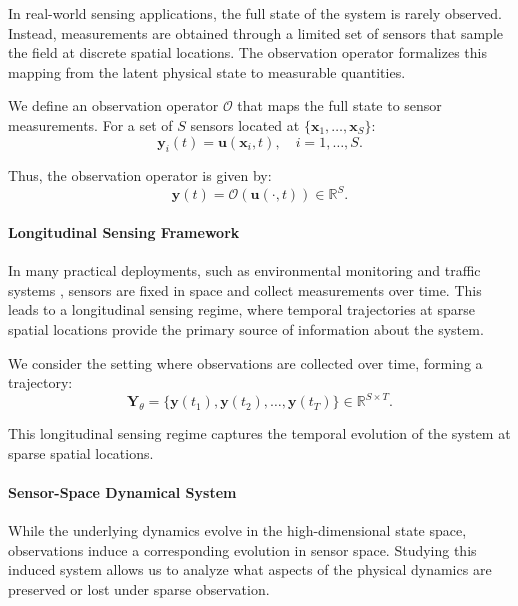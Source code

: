 In real-world sensing applications, the full state of the system is rarely observed. Instead, measurements are obtained through a limited set of sensors that sample the field at discrete spatial locations. The observation operator formalizes this mapping from the latent physical state to measurable quantities.

We define an observation operator $\mathcal{O}$ that maps the full state to sensor measurements. For a set of $S$ sensors located at $\{\mathbf{x}_1, \dots, \mathbf{x}_S\}$:
\begin{equation}
\mathbf{y}_i(t) = \mathbf{u}(\mathbf{x}_i, t), \quad i = 1, \dots, S.
\end{equation}

Thus, the observation operator is given by:
\begin{equation}
\mathbf{y}(t) = \mathcal{O}(\mathbf{u}(\cdot,t)) \in \mathbb{R}^S.
\end{equation}

\paragraph{Longitudinal Sensing Framework}

In many practical deployments, such as environmental monitoring \citep{bhardwaj2025comprehensive, iyer2022modeling} and traffic systems \citep{bhardwaj2023understanding}, sensors are fixed in space and collect measurements over time. This leads to a longitudinal sensing regime, where temporal trajectories at sparse spatial locations provide the primary source of information about the system.

We consider the setting where observations are collected over time, forming a trajectory:
\begin{equation}
\mathbf{Y}_\theta = \{\mathbf{y}(t_1), \mathbf{y}(t_2), \dots, \mathbf{y}(t_T)\} \in \mathbb{R}^{S \times T}.
\end{equation}

This longitudinal sensing regime captures the temporal evolution of the system at sparse spatial locations.

\paragraph{Sensor-Space Dynamical System}

While the underlying dynamics evolve in the high-dimensional state space, observations induce a corresponding evolution in sensor space. Studying this induced system allows us to analyze what aspects of the physical dynamics are preserved or lost under sparse observation.

